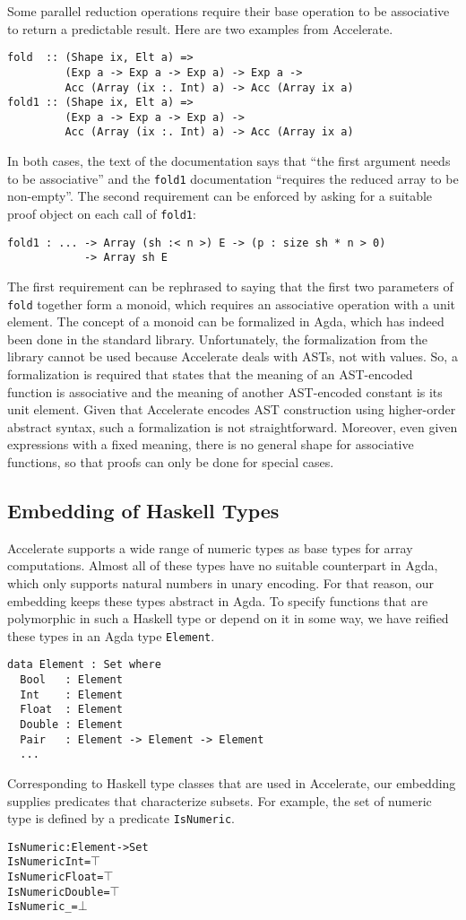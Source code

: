 \documentclass{llncs}
\begin{document}
Some parallel reduction operations require their base operation to be
associative to return a predictable result. Here are two examples from
Accelerate. 
\begin{verbatim}
fold  :: (Shape ix, Elt a) =>
         (Exp a -> Exp a -> Exp a) -> Exp a ->
         Acc (Array (ix :. Int) a) -> Acc (Array ix a)
fold1 :: (Shape ix, Elt a) =>
         (Exp a -> Exp a -> Exp a) ->
         Acc (Array (ix :. Int) a) -> Acc (Array ix a)
\end{verbatim}
In both cases, the text of the documentation says that ``the first
argument needs to be associative'' and the \texttt{fold1}
documentation ``requires the reduced array to be non-empty''.
The second requirement can be enforced by asking for a suitable proof
object on each call of \texttt{fold1}:
\begin{verbatim}
fold1 : ... -> Array (sh :< n >) E -> (p : size sh * n > 0)
            -> Array sh E
\end{verbatim}
The first requirement can be rephrased to saying that the first two
parameters of \texttt{fold} together form a monoid, which requires an
associative operation with a unit element. The concept of a monoid
can be formalized in Agda, which has indeed been done in the standard
library. Unfortunately, the formalization from the library cannot be
used because Accelerate deals with ASTs, not with values. So, a
formalization is required that states that the meaning of an
AST-encoded function is associative and the meaning of another
AST-encoded constant is its unit element. Given that Accelerate
encodes AST construction using higher-order abstract syntax, such a
formalization is not straightforward. Moreover, even given expressions
with a fixed meaning, there is no general shape for associative
functions, so that proofs can only be done for special cases. 

\subsection{Embedding of Haskell Types}
\label{sec:embedding-constants}

Accelerate supports a wide range of numeric types as base types for
array computations. Almost all of these types have no suitable
counterpart in Agda, which only supports natural numbers in unary
encoding. For that reason, our embedding keeps these types 
abstract in Agda. To specify functions that are polymorphic in such a
Haskell type or depend on it in some way, we have reified these types
in an Agda type \texttt{Element}.
\begin{verbatim}
data Element : Set where
  Bool   : Element
  Int    : Element
  Float  : Element
  Double : Element
  Pair   : Element -> Element -> Element
  ...
\end{verbatim}
Corresponding to Haskell type classes that are used in Accelerate, our
embedding supplies predicates that characterize subsets. For example,
the set of numeric type is defined by a predicate \texttt{IsNumeric}.
\begin{alltt}
IsNumeric : Element -> Set
IsNumeric Int = \(\top\)
IsNumeric Float = \(\top\)
IsNumeric Double = \(\top\)
IsNumeric _ = \(\bot\)
\end{alltt}
\end{document}
